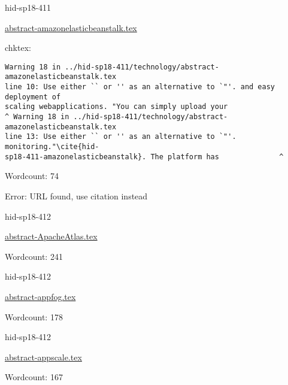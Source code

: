 \begin{IU}

hid-sp18-411

\href{https://github.com/cloudmesh-community/hid-sp18-411/blob/master//technology/abstract-amazonelasticbeanstalk.tex}{abstract-amazonelasticbeanstalk.tex}

 
chktex:
\begin{tiny}
\begin{verbatim}
Warning 18 in ../hid-sp18-411/technology/abstract-amazonelasticbeanstalk.tex
line 10: Use either `` or '' as an alternative to `"'. and easy deployment of
scaling webapplications. "You can simply upload your
^ Warning 18 in ../hid-sp18-411/technology/abstract-amazonelasticbeanstalk.tex
line 13: Use either `` or '' as an alternative to `"'. monitoring."\cite{hid-
sp18-411-amazonelasticbeanstalk}. The platform has              ^
\end{verbatim}
\end{tiny}

Wordcount: 74

Error: URL found, use citation instead
\end{IU}



\begin{IU}

hid-sp18-412

\href{https://github.com/cloudmesh-community/hid-sp18-412/blob/master//technology/abstract-ApacheAtlas.tex}{abstract-ApacheAtlas.tex}

 

Wordcount: 241

\end{IU}



\begin{IU}

hid-sp18-412

\href{https://github.com/cloudmesh-community/hid-sp18-412/blob/master//technology/abstract-appfog.tex}{abstract-appfog.tex}

 

Wordcount: 178

\end{IU}



\begin{IU}

hid-sp18-412

\href{https://github.com/cloudmesh-community/hid-sp18-412/blob/master//technology/abstract-appscale.tex}{abstract-appscale.tex}

 

Wordcount: 167

\end{IU}

